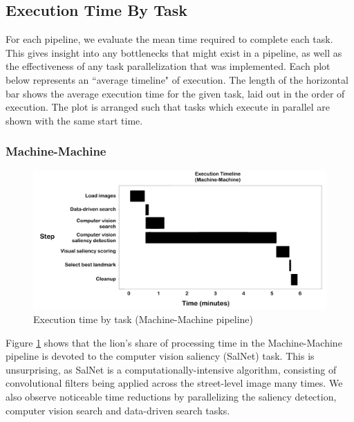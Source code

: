 \subsection{Execution Time By Task}

For each pipeline, we evaluate the mean time required to complete each task. This gives insight into any bottlenecks that might exist in a pipeline, as well as the effectiveness of any task parallelization that was implemented. Each plot below represents an ``average timeline" of execution. The length of the horizontal bar shows the average execution time for the given task, laid out in the order of execution. The plot is arranged such that tasks which execute in parallel are shown with the same start time.

\subsubsection{Machine-Machine}
\begin{figure}[htbp]
  \centering
  \includegraphics[width=\textwidth]{images/timeline_mm.pdf}
  \caption{Execution time by task (Machine-Machine pipeline)}
  \label{fig:plot:timeline:mm}
\end{figure}

Figure \ref{fig:plot:timeline:mm} shows that the lion's share of processing time in the Machine-Machine pipeline is devoted to the computer vision saliency (SalNet) task. This is unsurprising, as SalNet is a computationally-intensive algorithm, consisting of convolutional filters being applied across the street-level image many times. We also observe noticeable time reductions by parallelizing the saliency detection, computer vision search and data-driven search tasks.

